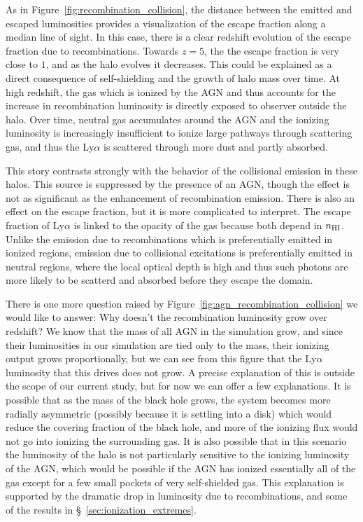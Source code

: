 As in Figure~\ref{fig:recombination_collision}, the distance between the emitted and escaped luminosities provides a visualization of the escape fraction along a median line of sight.
In this case, there is a clear redshift evolution of the escape fraction due to recombinations.
Towards $z=5$, the the escape fraction is very close to $1$, and as the halo evolves it decreases.
This could be explained as a direct consequence of self-shielding and the growth of halo mass over time.
At high redshift, the gas which is ionized by the AGN and thus accounts for the increase in recombination luminosity is directly exposed to observer outside the halo.
Over time, neutral gas accumulates around the AGN and the ionizing luminosity is increasingly insufficient to ionize large pathways through scattering gas, and thus the Ly$\alpha$ is scattered through more dust and partly absorbed.

This story contrasts strongly with the behavior of the collisional emission in these halos.
This source is suppressed by the presence of an AGN, though the effect is not as significant as the enhancement of recombination emission.
There is also an effect on the escape fraction, but it is more complicated to interpret.
The escape fraction of Ly$\alpha$ is linked to the opacity of the gas because both depend in $n_{\rm{HI}}$.
Unlike the emission due to recombinations which is preferentially emitted in ionized regions, emission due to collisional excitations is preferentially emitted in neutral regions, where the local optical depth is high and thus such photons are more likely to be scatterd and absorbed before they escape the domain.

There is one more question raised by Figure~\ref{fig:agn_recombination_collision} we would like to answer: Why doesn't the recombination luminosity grow over redshift?
We know that the mass of all AGN in the simulation grow, and since their luminosities in our simulation are tied only to the mass, their ionizing output grows proportionally, but we can see from this figure that the Ly$\alpha$ luminosity that this drives does not grow.
A precise explanation of this is outside the scope of our current study, but for now we can offer a few explanations.
It is possible that as the mass of the black hole grows, the system becomes more radially asymmetric (possibly because it is settling into a disk) which would reduce the covering fraction of the black hole, and more of the ionizing flux would not go into ionizing the surrounding gas.
It is also possible that in this scenario the luminosity of the halo is not particularly sensitive to the ionizing luminosity of the AGN, which would be possible if the AGN has ionized essentially all of the gas except for a few small pockets of very self-shielded gas.
This explanation is supported by the dramatic drop in luminosity due to recombinations, and some of the results in \S~\ref{sec:ionization_extremes}.

